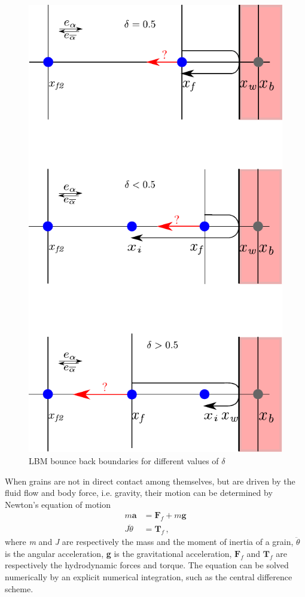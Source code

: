 \begin{figure}[htbp]
\centering
\includegraphics[height=0.9\textheight]{bouncemod}
\caption{LBM bounce back boundaries for different values of $\delta$}
\label{fig:bouncemod}
\end{figure}

When grains are not in direct contact among themselves, but are driven by 
the fluid flow and body force, i.e. gravity, their motion can be determined by 
Newton's equation of motion
%
\begin{align}
\mathit{m}\mathbf{ a} & = \mathbf{F}_{f} + \mathit{m }\mathbf{g} \\
\mathit{J } \ddot{\theta} & = \mathbf{T}_{f} \,,
\end{align}
%
\noindent where \textit{m} and \textit{J} are respectively the mass and the 
moment of inertia of a grain, $\ddot{\theta}$ is the 
angular acceleration, \textbf{g} is the gravitational acceleration,
$\mathbf{F}_{f}$ and $\mathbf{T}_{f}$ are respectively the hydrodynamic forces 
and torque. The equation can be solved numerically by an explicit numerical 
integration, such as the central difference scheme. 

